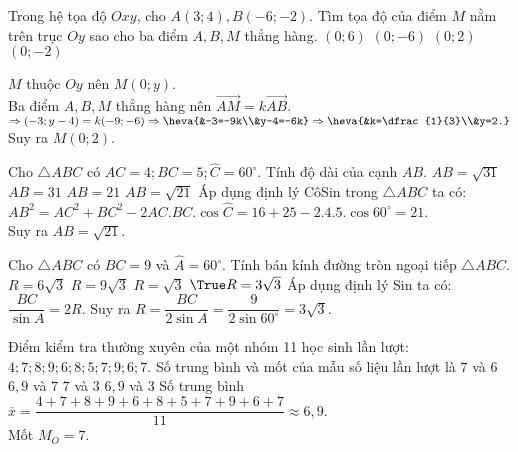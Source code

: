 \begin{ex}%
	Trong hệ tọa độ $O x y$, cho $A(3 ; 4), B(-6 ;-2)$. Tìm tọa độ của điểm $M$ nằm trên trục $O y$ sao cho ba điểm $A, B, M$ thẳng hàng.
	\choice
	{$(0 ; 6)$}
	{$(0 ; -6)$}
	{\True $(0 ; 2)$}
	{$(0 ; -2)$}
	\loigiai
	{
		$M$ thuộc $Oy$ nên $M(0;y)$.\\
		Ba điểm $A,B,M$ thẳng hàng nên $\overrightarrow{AM}=k\overrightarrow{AB}$.\\
		$\Rightarrow (-3;y-4)=k(-9;-6) \Rightarrow \heva{&-3=-9k\\&y-4=-6k}\Rightarrow \heva{&k=\dfrac{1}{3}\\&y=2.}$\\
		Suy ra $M(0;2)$.
		
	}
\end{ex}
\begin{ex}%
	Cho $\triangle A B C$ có $A C=4 ; B C=5 ; \widehat{C}=60^{\circ}$. Tính độ dài của cạnh $AB$.
	\choice
	{$A B=\sqrt{31}$}
	{$A B=31$}
	{$A B=21$}
	{\True $A B=\sqrt{21}$}
	\loigiai
	{
		Áp dụng định lý CôSin trong $\triangle ABC$ ta có:\\
		$AB^2=AC^2+BC^2-2AC.BC.\cos\widehat{C} = 16+25-2.4.5.\cos 60^\circ =21$.\\
		Suy ra $AB=\sqrt{21}$.
	}
\end{ex}
\begin{ex}%
Cho $\triangle A B C$ có $B C=9$ và $\widehat{A}=60^{\circ}$. Tính bán kính đường tròn ngoại tiếp $\triangle A B C$.
	\choice
	{$R=6 \sqrt{3}$}
	{$R=9 \sqrt{3}$}
	{$R=\sqrt{3}$}
	{$\True R=3 \sqrt{3}$}
	\loigiai
	{
		Áp dụng định lý Sin ta có: $\dfrac{BC}{\sin A}=2R$. Suy ra $R=\dfrac{BC}{2\sin A}=\dfrac{9}{2\sin 60^\circ}=3\sqrt{3}$.
	}
\end{ex}
\begin{ex}%
	Điểm kiểm tra thường xuyên của một nhóm 11 học sinh lần lượt: $4;7;8;9;6;8;5;7;9;6;7$. Số trung bình và mốt của mẫu số liệu lần lượt là
	\choice
	{$7$ và $6$ }
	{\True $6{,}9$ và $7$}
	{$7$ và $3$}
	{$6{,}9$ và $3$}
	\loigiai
	{
	Số trung bình	$\overline x  = \dfrac{4+7+8+9+6+8+5+7+9+6+7}{11}\approx 6{,}9$.\\
	Mốt $M_O = 7$.
	}
\end{ex}


